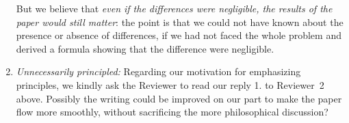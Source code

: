 \documentclass{article}
\begin{document}
\begin{enumerate}[wide]
  But we believe that \emph{even if the differences were negligible, the
    results of the paper would still matter}: the point is that we could
  not have known about the presence or absence of differences, if we had
  not faced the whole problem and derived a formula showing that the
  difference were negligible.
\item\emph{Unnecessarily principled:} Regarding our motivation for emphasizing
  principles, we kindly ask the Reviewer to read our reply 1. to Reviewer~2
  above. Possibly the writing could be improved on our part to make the
  paper flow more smoothly, without sacrificing the more philosophical
  discussion?
\end{enumerate}
\end{document}
